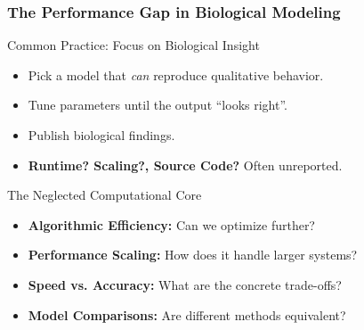 \documentclass[10pt,t]{beamer}
\begin{document}
\begin{frame}
    \frametitle{The Performance Gap in Biological Modeling}

    \begin{block}{Common Practice: Focus on Biological Insight}
        \begin{itemize}
            \item Pick a model that \textit{can} reproduce qualitative behavior.
            \item Tune parameters until the output ``looks right''.
            \item Publish biological findings.
            \item \textbf{Runtime? Scaling?, Source Code?} Often unreported.
        \end{itemize}
    \end{block}

    \vspace{0.1cm}

    \begin{alertblock}{The Neglected Computational Core}
        \begin{itemize}
            \item \textbf{Algorithmic Efficiency:} Can we optimize further?
            \item \textbf{Performance Scaling:} How does it handle larger systems?
            \item \textbf{Speed vs. Accuracy:} What are the concrete trade-offs?
            \item \textbf{Model Comparisons:} Are different methods equivalent?
        \end{itemize}
    \end{alertblock}
\end{frame}
\end{document}
